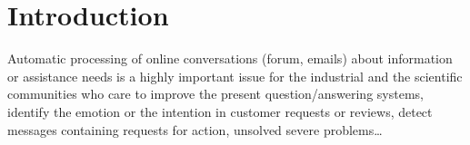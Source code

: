 
\section{Introduction}
\label{sec:intro}

Automatic processing of online conversations (forum, emails) about information or assistance needs 
is a highly important issue for the industrial and the scientific communities who care to improve the present question/answering systems, identify the emotion or the intention in customer requests or reviews, detect messages containing requests for action, unsolved severe problems\ldots











